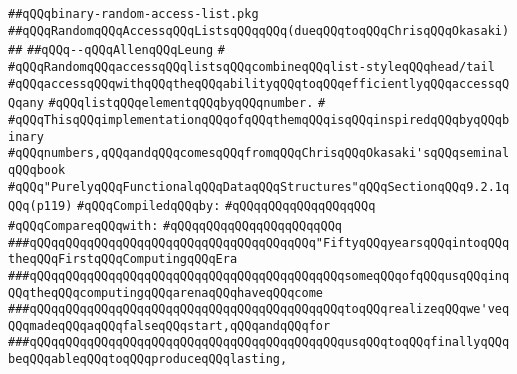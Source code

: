 \label{src/lib/src/binary-random-access-list.pkg}
\verb|##qQQqbinary-random-access-list.pkg|\newline
\verb|##qQQqRandomqQQqAccessqQQqListsqQQqqQQq(dueqQQqtoqQQqChrisqQQqOkasaki)|\newline
\verb|##|\newline
\verb|##qQQq--qQQqAllenqQQqLeung|\newline
\verb|#|\newline
\verb|#qQQqRandomqQQqaccessqQQqlistsqQQqcombineqQQqlist-styleqQQqhead/tail|\newline
\verb|#qQQqaccessqQQqwithqQQqtheqQQqabilityqQQqtoqQQqefficientlyqQQqaccessqQQqany|\newline
\verb|#qQQqlistqQQqelementqQQqbyqQQqnumber.|\newline
\verb|#|\newline
\verb|#qQQqThisqQQqimplementationqQQqofqQQqthemqQQqisqQQqinspiredqQQqbyqQQqbinary|\newline
\verb|#qQQqnumbers,qQQqandqQQqcomesqQQqfromqQQqChrisqQQqOkasaki'sqQQqseminalqQQqbook|\newline
\verb|#qQQq"PurelyqQQqFunctionalqQQqDataqQQqStructures"qQQqSectionqQQq9.2.1qQQq(p119)|\newline
\newline
\verb|#qQQqCompiledqQQqby:|\newline
\verb|#qQQqqQQqqQQqqQQqqQQq|\newline
\newline
\verb|#qQQqCompareqQQqwith:|\newline
\verb|#qQQqqQQqqQQqqQQqqQQq|\verb|qQQq|\newline
\newline
\newline
\verb|###qQQqqQQqqQQqqQQqqQQqqQQqqQQqqQQqqQQqqQQq"FiftyqQQqyearsqQQqintoqQQqtheqQQqFirstqQQqComputingqQQqEra|\newline
\verb|###qQQqqQQqqQQqqQQqqQQqqQQqqQQqqQQqqQQqqQQqqQQqsomeqQQqofqQQqusqQQqinqQQqtheqQQqcomputingqQQqarenaqQQqhaveqQQqcome|\newline
\verb|###qQQqqQQqqQQqqQQqqQQqqQQqqQQqqQQqqQQqqQQqqQQqtoqQQqrealizeqQQqwe'veqQQqmadeqQQqaqQQqfalseqQQqstart,qQQqandqQQqfor|\newline
\verb|###qQQqqQQqqQQqqQQqqQQqqQQqqQQqqQQqqQQqqQQqqQQqusqQQqtoqQQqfinallyqQQqbeqQQqableqQQqtoqQQqproduceqQQqlasting,|\newline
